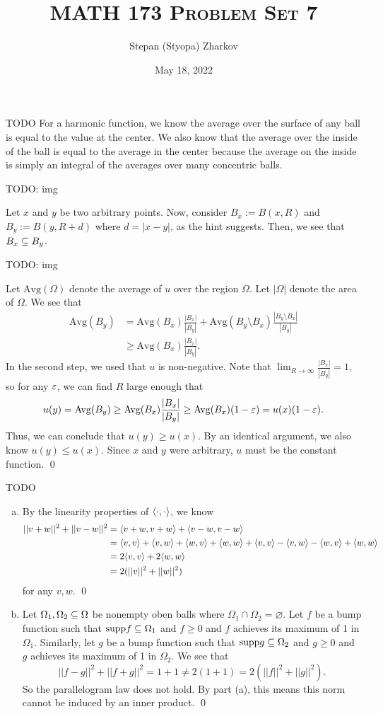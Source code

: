 \documentclass{article}
\title{\textsc{MATH 173 Problem Set 7}}
\author{Stepan (Styopa) Zharkov}
\date{May 18, 2022}
\begin{document}
\maketitle
{} TODO
 \tri
\hop 
\solution
For a harmonic function, we know the average over the surface of any ball is equal to the value at the center. We also know that the average over the inside of the ball is equal to the average in the center because the average on the inside is simply an integral of the averages over many concentric balls. 

TODO: img 

Let $x$ and $y$ be two arbitrary points. Now, consider $B_x := B(x,R)$ and $B_y := B(y, R+d)$ where $d = |x - y|$, as the hint suggests. Then, we see that $B_x \subseteq B_y$. 

TODO: img 

Let $\text{Avg}(\Omega)$ denote the average of $u$ over the region $\Omega$. Let $|\Omega|$ denote the area of $\Omega$. We see that 
\newcommand{\Avg}{\text{Avg}}
\begin{align*}
    \Avg(B_y) &= \Avg(B_x)\frac{|B_x|}{|B_y|} + \Avg(B_y\setminus B_x)\frac{|B_y \setminus B_x|}{|B_y|} \\
    & \ge \Avg(B_x)\frac{|B_x|}{|B_y|}.
\end{align*}
In the second step, we used that $u$ is non-negative. Note that $\lim_{R \to \infty} \frac{|B_x|}{|B_y|} = 1$, so for any $\varepsilon$, we can find $R$ large enough that
\[u(y) = \Avg(B_y) \ge  \Avg(B_x)\frac{|B_x|}{|B_y|} \ge \Avg(B_x)(1-\eps) = u(x)(1-\eps).\] 
Thus, we can conclude that $u(y) \ge u(x)$. By an identical argument, we also know $u(y) \le u(x)$. Since $x$ and $y$ were arbitrary, $u$ must be the constant function. \qed 


\newpage
{} TODO
 \tri
\hop 
\solution
\begin{enumerate}[(a)]
    \item By the linearity properties of $\langle\cdot, \cdot\rangle$, we know 
    \begin{align*}
        ||v+w||^2 + ||v - w||^2 &= \langle v+w, v+w\rangle + \langle v-w, v-w\rangle \\
        &= \langle v,v\rangle + \langle v,w\rangle + \langle w,v\rangle + \langle w,w\rangle +\langle v,v\rangle-\langle v,w\rangle - \langle w,v\rangle + \langle w,w\rangle \\
        &= 2\langle v,v\rangle + 2 \langle w,w\rangle\\
        &= 2(||v||^2 + ||w||^2)
    \end{align*}
    for any $v,w$. \qed
    \item Let $\Omega_1, \Omega_2 \subseteq \Omega$ be nonempty oben balls where $\Omega_1 \cap \Omega_2 = \varnothing$. Let $f$ be a bump function such that $\text{supp}{f} \subseteq \Omega_1$ and $f \ge 0$ and $f$ achieves its maximum of 1 in $\Omega_1$. Similarly, let $g$ be a bump function such that $\text{supp}{g} \subseteq \Omega_2$ and $g \ge 0$ and $g$ achieves its maximum of 1 in $\Omega_2$.
    \hop 
    We see that 
    \[||f-g||^2 + ||f+g||^2 = 1+1 \ne 2(1+1) = 2(||f||^2 + ||g||^2).\]
    So the parallelogram law does not hold. By part (a), this means this norm cannot be induced by an inner product. \qed
\end{enumerate}
\end{document}
